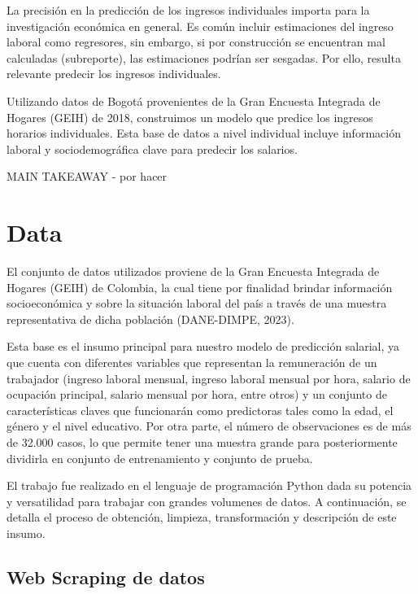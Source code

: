 \documentclass[11pt,oneside]{article}
\begin{document}
	La precisión en la predicción de los ingresos individuales importa para la investigación económica en general. Es común incluir estimaciones del ingreso laboral como regresores, sin embargo, si por construcción se encuentran mal calculadas (subreporte), las estimaciones podrían ser sesgadas. Por ello, resulta relevante predecir los ingresos individuales. 
	
	Utilizando datos de Bogotá provenientes de la Gran Encuesta Integrada de Hogares (GEIH) de 2018, construimos un modelo que predice los ingresos horarios individuales. Esta base de datos a nivel individual incluye información laboral y sociodemográfica clave para predecir los salarios.
	
	MAIN TAKEAWAY - por hacer

	\section{Data}
	
	El conjunto de datos utilizados proviene de la Gran Encuesta Integrada de Hogares (GEIH) de Colombia, la cual tiene por finalidad brindar información socioeconómica y sobre la situación laboral del país a través de una muestra representativa de dicha población (DANE-DIMPE, 2023). 
	
	Esta base es el insumo principal para nuestro modelo de predicción salarial, ya que cuenta con diferentes variables que representan la remuneración de un trabajador (ingreso laboral mensual, ingreso laboral mensual por hora, salario de ocupación principal, salario mensual por hora, entre otros) y un conjunto de características claves que funcionarán como predictoras tales como la edad, el género y el nivel educativo. Por otra parte, el número de observaciones es de más de 32.000 casos, lo que permite tener una muestra grande para posteriormente dividirla en conjunto de entrenamiento y conjunto de prueba. 
	
	El trabajo fue realizado en el lenguaje de programación Python dada su potencia y versatilidad para trabajar con grandes volumenes de datos. A continuación, se detalla el proceso de obtención, limpieza, transformación y descripción de este insumo. 
	
	\subsection{Web Scraping de datos}
	
\end{document}
